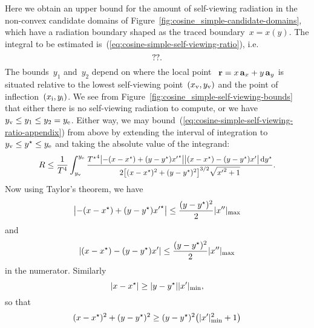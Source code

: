 Here we obtain an upper bound for the amount of self-viewing radiation
in the non-convex candidate domains
of Figure~\ref{fig:cosine_simple-candidate-domains},
which have a radiation boundary shaped as the traced boundary~$x = x (y)$.
The integral to be estimated is~(\ref{eq:cosine-simple-self-viewing-ratio}),
i.e.
\begin{equation}
  \usecontent{eq:cosine-simple-self-viewing-ratio}.
  \label{eq:cosine-simple-self-viewing-ratio-appendix}
\end{equation}
The bounds~$y_1$ and~$y_2$ depend
on where the local point~%
$\boldsymbol{\mathbf{r}} = x \mathop{}\!\boldsymbol{\mathbf{a}}_{x} + y \mathop{}\!\boldsymbol{\mathbf{a}}_{y}$ is situated
relative to the lowest self-viewing point~$(x_{\mathrm{v}}, y_{\mathrm{v}})$
and the point of inflection~$(x_{\mathrm{i}}, y_{\mathrm{i}})$.
We see from Figure~\ref{fig:cosine_simple-self-viewing-bounds}
that either there is no self-viewing radiation to compute,
or we have~$y_{\mathrm{v}} \le y_1 \le y_2 = y_{\mathrm{e}}$.
Either way,
we may bound~(\ref{eq:cosine-simple-self-viewing-ratio-appendix}) from above
by extending the interval of integration to~$y_{\mathrm{v}} \le y^\star \le y_{\mathrm{e}}$
and taking the absolute value of the integrand:
\begin{equation}
  R \le
    \frac{1}{T^4}
    \int_{y_\view}^{y_\End}
      \smallerfrac{
        {T^\star}^4
        \abs[\big]{-(x - x^\star) + (y - y^\star) {x'}^\star}
        \abs[\big]{(x - x^\star) - (y - y^\star) x'}
        \td y^\star
      }{
        2
        \squarebr[\big]{(x - x^\star)^2 + (y - y^\star)^2}^{3/2}
        \sqrt{{x'}^2 + 1}
      }.
  \label{eq:cosine-simple-self-viewing-ratio-bound-bounds}
\end{equation}
Now using Taylor's theorem, we have
\begin{equation}
  \abs*{-(x - x^\star) + (y - y^\star) {x'}^\star} \le
    \frac{(y - y^\star)^2}{2} \abs{x''}_{\max}
  \label{eq:taylor-second-order-remainder-upper-bound-starred}
\end{equation}
and
\begin{equation}
  \abs*{(x - x^\star) - (y - y^\star) x'} \le
    \frac{(y - y^\star)^2}{2} \abs{x''}_{\max}
  \label{eq:taylor-second-order-remainder-upper-bound}
\end{equation}
in the numerator.
Similarly
\begin{equation}
  \abs{x - x^\star} \ge \abs{y - y^\star} \abs{x'}_{\min},
  \label{eq:taylor-first-order-remainder-lower-bound}
\end{equation}
so that
\begin{equation}
  (x - x^\star)^2 + (y - y^\star)^2 \ge
    (y - y^\star)^2 \roundbr*{\abs{x'}_{\min}^2 + 1}
  \label{eq:displacement-squared-lower-bound}
\end{equation}

